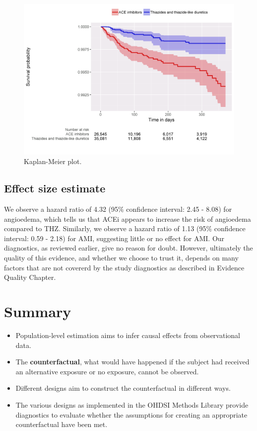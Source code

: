 \documentclass[]{book}
\begin{document}
\begin{figure}

{\centering \includegraphics[width=1\linewidth]{images/PopulationLevelEstimation/kmPlot} 

}

\caption{Kaplan-Meier plot.}\label{fig:kmPlot}
\end{figure}

\hypertarget{effect-size-estimate}{%
\subsection{Effect size estimate}\label{effect-size-estimate}}

We observe a hazard ratio of 4.32 (95\% confidence interval: 2.45 - 8.08) for angioedema, which tells us that ACEi appears to increase the risk of angioedema compared to THZ. Similarly, we observe a hazard ratio of 1.13 (95\% confidence interval: 0.59 - 2.18) for AMI, suggesting little or no effect for AMI. Our diagnostics, as reviewed earlier, give no reason for doubt. However, ultimately the quality of this evidence, and whether we choose to trust it, depends on many factors that are not covererd by the study diagnostics as described in Evidence Quality Chapter.

\hypertarget{summary}{%
\section{Summary}\label{summary}}

\begin{itemize}
\item
  Population-level estimation aims to infer causal effects from observational data.
\item
  The \textbf{counterfactual}, what would have happened if the subject had received an alternative exposure or no exposure, cannot be observed.
\item
  Different designs aim to construct the counterfactual in different ways.
\item
  The various designs as implemented in the OHDSI Methods Library provide diagnostics to evaluate whether the assumptions for creating an appropriate counterfactual have been met.
\end{itemize}
\end{document}
